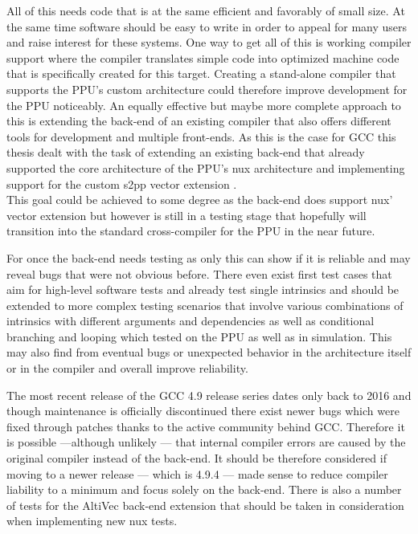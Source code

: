 All of this needs code that is at the same efficient and favorably of small size.
At the same time software should be easy to write in order to appeal for many users and raise interest for these systems.
One way to get all of this is working compiler support where the compiler translates simple code into optimized machine code that is specifically created for this target.
Creating a stand-alone compiler that supports the PPU's custom architecture could therefore improve development for the PPU noticeably.
An equally effective but maybe more complete approach to this is extending the back-end of an existing compiler that also offers different tools for development and multiple front-ends.
As this is the case for GCC this thesis dealt with the task of extending an existing back-end that already supported the core architecture of the PPU's nux architecture and implementing support for the custom s2pp vector extension .
\\
This goal could be achieved to some degree as the back-end does support nux' vector extension but however is still in a testing stage that hopefully will transition into the standard cross-compiler for the PPU in the near future.

For once the back-end needs testing as only this can show if it is reliable and may reveal bugs that were not obvious before.
There even exist first test cases that aim for high-level software tests and already test single intrinsics and should be extended to more complex testing scenarios that involve various combinations of intrinsics with different arguments and dependencies as well as conditional branching and looping which tested on the PPU as well as in simulation.
This may also find from eventual bugs or unexpected behavior in the architecture itself or in the compiler and overall improve reliability.

The most recent release of the GCC 4.9 release series dates only back to 2016 and though maintenance is officially discontinued \cite{https://gcc.gnu.org/gcc-4.9/} there exist newer bugs which were fixed through patches thanks to the active community behind GCC.
Therefore it is possible ---although unlikely --- that internal compiler errors are caused by the original compiler instead of the back-end.
It should be therefore considered if moving to a newer release --- which is 4.9.4 --- made sense to reduce compiler liability to a minimum and focus solely on the back-end.
There is also a number of tests for the AltiVec back-end extension that should be taken in consideration when implementing new nux tests.

